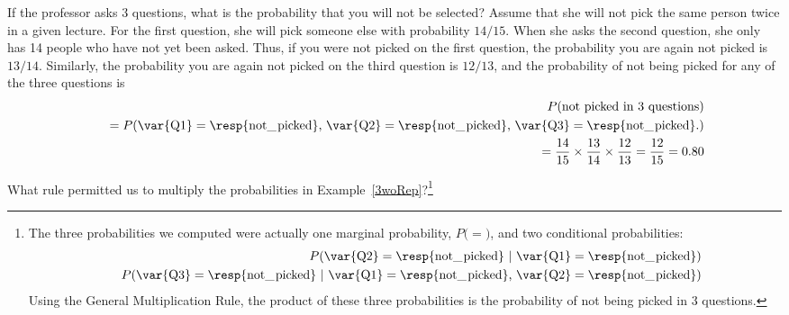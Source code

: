 \begin{example}{If the professor asks 3 questions, what is the probability that you will not be selected? Assume that she will not pick the same person twice in a given lecture.}\label{3woRep}
For the first question, she will pick someone else with probability $14/15$. When she asks the second question, she only has 14 people who have not yet been asked. Thus, if you were not picked on the first question, the probability you are again not picked is $13/14$. Similarly, the probability you are again not picked on the third question is $12/13$, and the probability of not being picked for any of the three questions is
\begin{eqnarray*}
&&P(\text{not picked in 3 questions}) \\
&&\quad = P(\text{\var{Q1}} = \text{\resp{not\_\hspace{0.3mm}picked}, }\text{\var{Q2}} = \text{\resp{not\_\hspace{0.3mm}picked}, }\text{\var{Q3}} = \text{\resp{not\_\hspace{0.3mm}picked}.}) \\
&&\quad = \frac{14}{15}\times\frac{13}{14}\times\frac{12}{13} = \frac{12}{15} = 0.80
\end{eqnarray*}
\end{example}

\begin{exercise}
What rule permitted us to multiply the probabilities in Example~\ref{3woRep}?\footnote{The three probabilities we computed were actually one marginal probability, $P($$ = $$)$, and two conditional probabilities:
\begin{eqnarray*}
&&P(\text{\var{Q2}} =  \text{\resp{not\_\hspace{0.3mm}picked} }|\text{ \var{Q1}} = \text{\resp{not\_\hspace{0.3mm}picked}}) \\
&&P(\text{\var{Q3}} =  \text{\resp{not\_\hspace{0.3mm}picked} }|\text{ \var{Q1}} = \text{\resp{not\_\hspace{0.3mm}picked}, }\text{\var{Q2}} = \text{\resp{not\_\hspace{0.3mm}picked}})
\end{eqnarray*}
Using the General Multiplication Rule, the product of these three probabilities is the probability of not being picked in 3 questions.}
\end{exercise}


